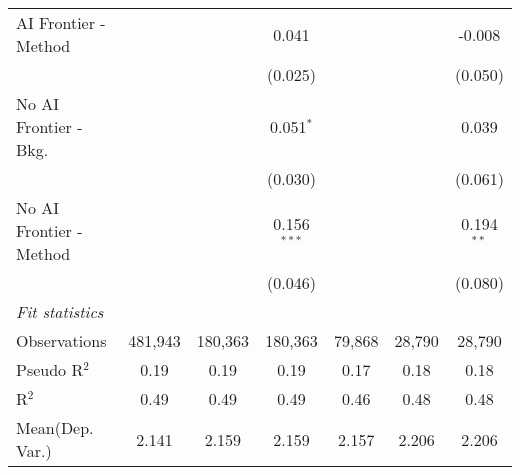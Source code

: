 \begin{tabular}{lcccccc}
   AI Frontier - Method    &               &               & 0.041         &               &               & -0.008\\   
                           &               &               & (0.025)       &               &               & (0.050)\\   
   No AI Frontier - Bkg.   &               &               & 0.051$^{*}$   &               &               & 0.039\\   
                           &               &               & (0.030)       &               &               & (0.061)\\   
   No AI Frontier - Method &               &               & 0.156$^{***}$ &               &               & 0.194$^{**}$\\   
                           &               &               & (0.046)       &               &               & (0.080)\\   
   \midrule
   \emph{Fit statistics}\\
   Observations            & 481,943       & 180,363       & 180,363       & 79,868        & 28,790        & 28,790\\  
   Pseudo R$^2$            & 0.19          & 0.19          & 0.19          & 0.17          & 0.18          & 0.18\\  
   R$^2$                   & 0.49          & 0.49          & 0.49          & 0.46          & 0.48          & 0.48\\  
Mean(Dep. Var.) & 2.141 & 2.159 & 2.159 & 2.157 & 2.206 & 2.206 \\
   

\end{tabular}

